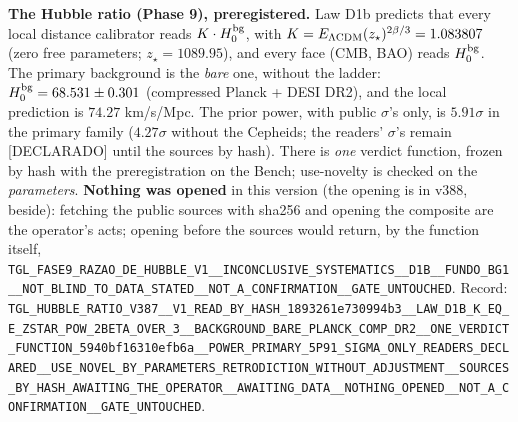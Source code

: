 \documentclass[11pt]{article}
\theoremstyle{definition}\newtheorem{deriv}{Derivation}
\begin{document}
\textbf{The Hubble ratio (Phase 9), preregistered.} Law D1b predicts that every local distance calibrator reads $K\cdot H_0^{\rm bg}$, with $K=E_{\Lambda\rm CDM}(z_\star)^{2\beta/3}=1.083807$ (zero free parameters; $z_\star=1089.95$), and every face (CMB, BAO) reads $H_0^{\rm bg}$. The primary background is the \emph{bare} one, without the ladder: $H_0^{\rm bg}=68.531\pm0.301$ (compressed Planck + DESI DR2), and the local prediction is $74.27$ km/s/Mpc. The prior power, with public $\sigma$'s only, is $5.91\sigma$ in the primary family ($4.27\sigma$ without the Cepheids; the readers' $\sigma$'s remain \textsf{[DECLARADO]} until the sources by hash). There is \emph{one} verdict function, frozen by hash with the preregistration on the Bench; use-novelty is checked on the \emph{parameters}. \textbf{Nothing was opened} in this version (the opening is in v388, beside): fetching the public sources with sha256 and opening the composite are the operator's acts; opening before the sources would return, by the function itself, \texttt{TGL\_\allowbreak{}FASE9\_\allowbreak{}RAZAO\_\allowbreak{}DE\_\allowbreak{}HUBBLE\_\allowbreak{}V1\_\allowbreak{}\_\allowbreak{}INCONCLUSIVE\_\allowbreak{}SYSTEMATICS\_\allowbreak{}\_\allowbreak{}D1B\_\allowbreak{}\_\allowbreak{}FUNDO\_\allowbreak{}BG1\_\allowbreak{}\_\allowbreak{}NOT\_\allowbreak{}BLIND\_\allowbreak{}TO\_\allowbreak{}DATA\_\allowbreak{}STATED\_\allowbreak{}\_\allowbreak{}NOT\_\allowbreak{}A\_\allowbreak{}CONFIRMATION\_\allowbreak{}\_\allowbreak{}GATE\_\allowbreak{}UNTOUCHED}. Record: \texttt{TGL\_\allowbreak{}HUBBLE\_\allowbreak{}RATIO\_\allowbreak{}V387\_\allowbreak{}\_\allowbreak{}V1\_\allowbreak{}READ\_\allowbreak{}BY\_\allowbreak{}HASH\_\allowbreak{}1893261e730994b3\_\allowbreak{}\_\allowbreak{}LAW\_\allowbreak{}D1B\_\allowbreak{}K\_\allowbreak{}EQ\_\allowbreak{}E\_\allowbreak{}ZSTAR\_\allowbreak{}POW\_\allowbreak{}2BETA\_\allowbreak{}OVER\_\allowbreak{}3\_\allowbreak{}\_\allowbreak{}BACKGROUND\_\allowbreak{}BARE\_\allowbreak{}PLANCK\_\allowbreak{}COMP\_\allowbreak{}DR2\_\allowbreak{}\_\allowbreak{}ONE\_\allowbreak{}VERDICT\_\allowbreak{}FUNCTION\_\allowbreak{}5940bf16310efb6a\_\allowbreak{}\_\allowbreak{}POWER\_\allowbreak{}PRIMARY\_\allowbreak{}5P91\_\allowbreak{}SIGMA\_\allowbreak{}ONLY\_\allowbreak{}READERS\_\allowbreak{}DECLARED\_\allowbreak{}\_\allowbreak{}USE\_\allowbreak{}NOVEL\_\allowbreak{}BY\_\allowbreak{}PARAMETERS\_\allowbreak{}RETRODICTION\_\allowbreak{}WITHOUT\_\allowbreak{}ADJUSTMENT\_\allowbreak{}\_\allowbreak{}SOURCES\_\allowbreak{}BY\_\allowbreak{}HASH\_\allowbreak{}AWAITING\_\allowbreak{}THE\_\allowbreak{}OPERATOR\_\allowbreak{}\_\allowbreak{}AWAITING\_\allowbreak{}DATA\_\allowbreak{}\_\allowbreak{}NOTHING\_\allowbreak{}OPENED\_\allowbreak{}\_\allowbreak{}NOT\_\allowbreak{}A\_\allowbreak{}CONFIRMATION\_\allowbreak{}\_\allowbreak{}GATE\_\allowbreak{}UNTOUCHED}.
\end{document}
